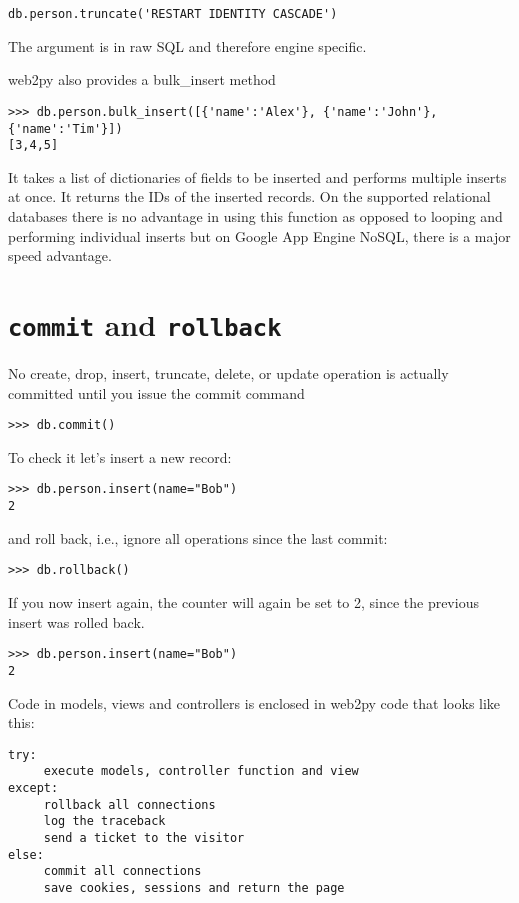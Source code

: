 \documentclass[justified,sixbynine,notoc]{tufte-book}
\def\ft{\small\tt}
\def\inxx#1{\index{#1}}
\begin{document}
\begin{fullwidth}
\begin{lstlisting}
db.person.truncate('RESTART IDENTITY CASCADE')
\end{lstlisting}

The argument is in raw SQL and therefore engine specific.

\inxx{bulk\_insert}
web2py also provides a bulk\_insert method
\begin{lstlisting}
>>> db.person.bulk_insert([{'name':'Alex'}, {'name':'John'}, {'name':'Tim'}])
[3,4,5]
\end{lstlisting}

It takes a list of dictionaries of fields to be inserted and performs multiple inserts at once. It returns the IDs of the inserted records. On the supported relational databases there is no advantage in using this function as opposed to looping and performing individual inserts but on Google App Engine NoSQL, there is a major speed advantage.

\goodbreak\section{{\ft commit} and {\ft rollback}}

No create, drop, insert, truncate, delete, or update operation is actually committed until you issue the commit command

\inxx{commit}
\begin{lstlisting}
>>> db.commit()
\end{lstlisting}

To check it let's insert a new record:
\begin{lstlisting}
>>> db.person.insert(name="Bob")
2
\end{lstlisting}
\noindent and roll back, i.e., ignore all operations since the last commit:

\inxx{rollback}
\begin{lstlisting}
>>> db.rollback()
\end{lstlisting}

If you now insert again, the counter will again be set to 2, since the previous insert was rolled back.
\begin{lstlisting}
>>> db.person.insert(name="Bob")
2
\end{lstlisting}

Code in models, views and controllers is enclosed in web2py code that looks like this:
\begin{lstlisting}
try:
     execute models, controller function and view
except:
     rollback all connections
     log the traceback
     send a ticket to the visitor
else:
     commit all connections
     save cookies, sessions and return the page
\end{lstlisting}


\end{fullwidth}
\end{document}
